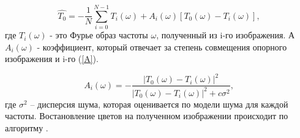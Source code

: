 \documentclass[a4paper,12pt]{article}
\begin{document}
\begin{equation}
\label{sum}
    \hat{T_0} = - \frac{1}{N} \sum\limits_{i=0}^{N-1} T_i(\omega) + A_i(\omega)[T_0(\omega) - T_i(\omega)],
\end{equation}
где $T_i(\omega)$ - это Фурье образ частоты $\omega$, полученный из i-го изображения. А $A_i(\omega)$ - коэффициент, который отвечает за степень совмещения опорного изображения и i-го (\ref{A}).

\begin{equation}
\label{A}
    A_i(\omega) = - \frac{|T_0(\omega) - T_i(\omega)|^2}{|T_0(\omega) - T_i(\omega)|^2 + c\sigma^2},
\end{equation}
где $\sigma^2$ -- дисперсия шума, которая оценивается по модели шума для каждой частоты. 
Востановление цветов на полученном изображении происходит по алгоритму \cite{46440}.


\printbibliography[heading=bibintoc]
\end{document}
